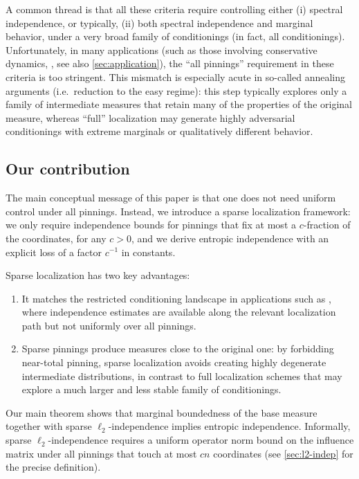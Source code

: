 \documentclass[11pt,reqno,letterpaper]{amsart}
\numberwithin{equation}{section}
\theoremstyle{definition}
\begin{document}
A common thread is that all these criteria require controlling either (i) spectral independence, or typically, (ii) both spectral independence and marginal behavior,
under a very broad family of conditionings (in fact, all conditionings). Unfortunately, in many applications (such as those involving conservative dynamics, \cite{JMPV, kuchukova2025fast}, see also \cref{sec:application}), the ``all pinnings'' requirement in these criteria is too stringent. This mismatch is especially acute in so-called annealing arguments (i.e.~reduction to the easy regime): this step typically explores only a family of intermediate measures that retain many of the properties of the original measure, whereas ``full''
localization may generate highly adversarial conditionings with extreme marginals or qualitatively different
behavior.


\subsection{Our contribution}



The main conceptual message of this paper is that one does {not} need uniform control under all pinnings.
Instead, we introduce a {sparse localization} framework: we only require independence bounds for
pinnings that fix at most a $c$-fraction of the coordinates, for any $c > 0$, and we derive entropic independence with an
explicit loss of a factor $c^{-1}$ in constants.

Sparse localization has two key advantages:
\begin{enumerate}[label=(\roman*),leftmargin=2.2em]
    \item It matches the {restricted conditioning} landscape in applications such as \cite{JMPV}, where
    independence estimates are available along the relevant localization path but not uniformly
    over all pinnings.
    \item Sparse pinnings produce measures {close} to the original one: by forbidding near-total pinning,
    sparse localization avoids creating highly degenerate intermediate distributions, in contrast to full
    localization schemes that may explore a much larger and less stable family of conditionings.
\end{enumerate}

Our main theorem shows that marginal boundedness of the base measure together with sparse $\ell_2$-independence implies entropic
independence. Informally, sparse $\ell_2$-independence requires a uniform operator norm bound on the
{influence matrix} under all pinnings that touch at most $cn$ coordinates (see
\cref{sec:l2-indep} for the precise definition).
\end{document}
